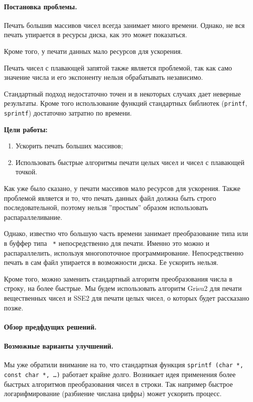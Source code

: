 \documentclass[specialist,subf,href,colorlinks=true,14pt
,times,mtpro,specialist
]{disser}
\begin{document}
\paragraph{Постановка проблемы.}
Печать большив массивов чисел всегда занимает много времени.
Однако, не вся печать упирается в ресурсы диска, как это может показаться.


Кроме того, у печати данных мало ресурсов для ускорения.

Печать чисел с плавающей запятой также является проблемой, так как само значение числа и его экспоненту нельзя обрабатывать независимо. 

Стандартный подход недостаточно точен и в некоторых случаях дает неверные результаты. 
Кроме того использование функций стандартных библиотек (\texttt{printf}, \texttt{sprintf}) достаточно затратно по времени.

\textbf{Цели работы:}
\begin{enumerate}
\item Ускорить печать больших массивов;
\item Использовать быстрые алгоритмы печати целых чисел и чисел с плавающей точкой.
\end{enumerate}


Как уже было сказано, у печати массивов мало ресурсов для ускорения.
Также проблемой является и то, что печать данных файл должна быть строго последовательной, поэтому нельзя ''простым'' образом использовать распараллеливание.

Однако, известно что большую часть времени занимает преобразование типа \texttt{} или \texttt{} в буффер типа \texttt{ *} непосредственно для печати.
Именно это можно и распараллелить, используя многопоточное программирование.
Непосредственно печать в сам файл упирается в возможности диска. 
Ее ускорить нельзя.

Кроме того, можно заменить стандартный алгоритм преобразования числа в строку, на более быстрые.
Мы будем использовать алгоритм \textsf{Grisu2} для печати вещественных чисел и \textsf{SSE2} для печати целых чисел, о которых будет рассказано позже.
\paragraph{Обзор предфдущих решений.}
\paragraph{Возможные варианты улучшений.}
Мы уже обратили внимание на то, что стандартная функция \texttt{sprintf (char *, const char *, \dots)} работает крайне долго. 
Возникает идея применения более быстрых алгоритмов преобразования чисел в строки. 
Так например быстрое логарифмирование (разбиение числана цифры) может ускорить процесс.
\end{document}
